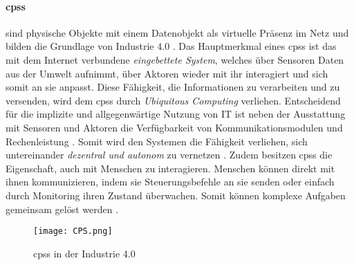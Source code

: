 \paragraph{\acf{cpss}}
sind physische Objekte mit einem Datenobjekt als virtuelle Präsenz im Netz und bilden die Grundlage von Industrie 4.0 \citep{Drath2016}. Das Hauptmerkmal eines \ac{cpss} ist das mit dem Internet verbundene \textit{eingebettete System}, welches über Sensoren Daten aus der Umwelt aufnimmt, über Aktoren wieder mit ihr interagiert und sich somit an sie anpasst. Diese Fähigkeit, die Informationen zu verarbeiten und zu versenden, wird dem \ac{cpss} durch \textit{Ubiquitous Computing} verliehen. Entscheidend für die implizite und allgegenwärtige Nutzung von IT  ist neben der Ausstattung mit Sensoren und Aktoren die Verfügbarkeit von Kommunikationsmodulen und Rechenleistung \citep{Roth2016}. Somit wird den Systemen die Fähigkeit verliehen, sich untereinander \textit{dezentral und autonom} zu vernetzen \citep{Bauernhansl2014}. Zudem besitzen \ac{cpss} die Eigenschaft, auch mit Menschen zu interagieren. Menschen können direkt mit ihnen kommunizieren, indem sie Steuerungsbefehle an sie senden oder einfach durch Monitoring ihren Zustand überwachen. Somit können komplexe Aufgaben gemeinsam gelöst werden \citep{Lueth2016}.


\begin{figure}[ht]
  \centering
  \texttt{[image: CPS.png]}
  \caption[CPS in der Industrie 4.0]{\ac{cpss} in der Industrie 4.0 \citep[S. 30]{Roth2016}}
  \label{fig:cpskreis}
\end{figure}


